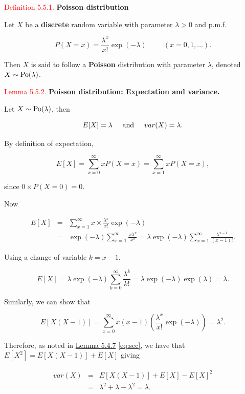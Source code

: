 \documentclass[
]{book}
\begin{document}
\leavevmode{}%
\textcolor{red}{Definition 5.5.1.}
{\textbf{Poisson distribution}}

Let \(X\) be a \textbf{discrete} random variable with parameter \(\lambda >0\) and p.m.f.

\[P(X=x) = \frac{\lambda^x}{x!} \exp(-\lambda) \hspace{1cm} (x=0,1,\ldots).\]

Then \(X\) is said to follow a \textbf{Poisson} distribution with parameter \(\lambda\), denoted \(X \sim {\rm Po} (\lambda)\).

\leavevmode{}%
\textcolor{red}{Lemma 5.5.2.}
{\textbf{Poisson distribution: Expectation and variance.}}

Let \(X \sim {\rm Po} (\lambda)\), then

\[ E[X]= \lambda \hspace{0.5cm} \mbox{and} \hspace{0.5cm} var(X) =  \lambda. \]

By definition of expectation,

\[
E[X] = \sum_{x=0}^\infty x P(X=x) = \sum_{x=1}^\infty x P(X=x), \]

since \(0 \times P(X=0) =0\).

Now

\begin{eqnarray*}
E[X] &=& \sum_{x=1}^\infty x \times \frac{\lambda^x}{x!} \exp(-\lambda) \\
&=& \exp(-\lambda) \sum_{x=1}^\infty \frac{x \lambda^x}{x!} = \lambda \exp(-\lambda) \sum_{x=1}^\infty \frac{ \lambda^{x-1}}{(x-1)!}. \end{eqnarray*}

Using a change of variable \(k=x-1\),

\[ E[X]= \lambda \exp(-\lambda) \sum_{k=0}^\infty \frac{ \lambda^k}{k!} = \lambda \exp(-\lambda) \exp(\lambda) =\lambda. \]

Similarly, we can show that

\[ E[X(X-1)] = \sum_{x=0}^\infty x (x-1) \left( \frac{\lambda^x}{x!} \exp(-\lambda) \right) = \lambda^2.  \]

Therefore, as noted in \protect\hyperlink{geometric_expectation}{Lemma 5.4.7} \eqref{eq:sec}, we have that \(E[X^2]=E[X(X-1)] + E[X]\) giving

\begin{eqnarray*}
var(X) &=& E[X(X-1)] + E[X] - E[X]^2 \\
 &=&  \lambda^2 + \lambda - \lambda^2 = \lambda. 
\end{eqnarray*}
\end{document}
